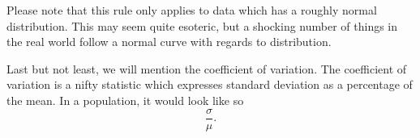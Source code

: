 Please note that this rule only applies to data which has a roughly normal distribution. This may seem quite esoteric, but a shocking number of things in the real world follow a normal curve with regards to distribution. \newline

Last but not least, we will mention the coefficient of variation. The coefficient of variation is a nifty statistic which expresses standard deviation as a percentage of the mean. In a population, it would look like so $$\frac{\sigma}{\mu}.$$